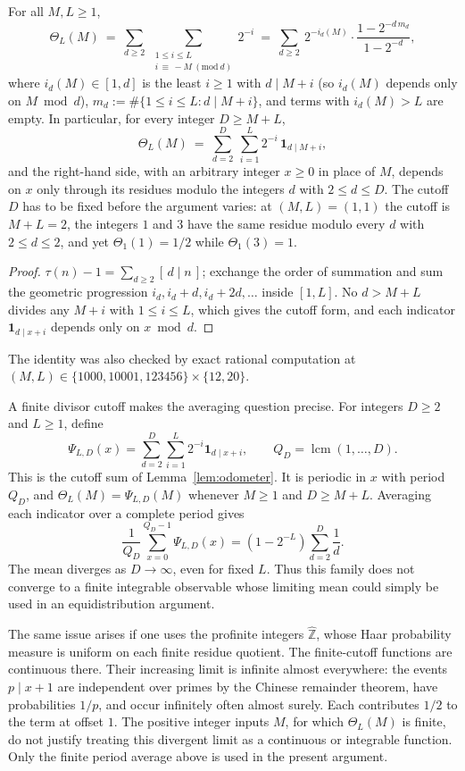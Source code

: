 \begin{lem}
\label{lem:odometer}
For all $M,L\ge 1$,
\[
\Theta_L(M)\ =\ \sum_{d\ge 2}\ \sum_{\substack{1\le i\le L\\ i\,\equiv\,-M\ (\mathrm{mod}\ d)}} 2^{-i}
\ =\ \sum_{d\ge 2}\ 2^{-i_d(M)}\cdot\frac{1-2^{-d\,m_d}}{1-2^{-d}},
\]
where $i_d(M)\in[1,d]$ is the least $i\ge1$ with $d\mid M+i$ (so $i_d(M)$ depends only on
$M \bmod d$), $m_d := \#\{1\le i\le L: d\mid M+i\}$, and terms with $i_d(M)>L$ are empty. In
particular, for every integer $D\ge M+L$,
\[
\Theta_L(M)\ =\ \sum_{d=2}^{D}\ \sum_{i=1}^{L} 2^{-i}\,\mathbf 1_{d\mid M+i},
\]
and the right-hand side, with an arbitrary integer $x\ge0$ in place of $M$, depends on $x$ only
through its residues modulo the integers $d$ with $2\le d\le D$. The cutoff $D$ has to be fixed
before the argument varies: at $(M,L)=(1,1)$ the cutoff is $M+L=2$, the integers $1$ and $3$ have
the same residue modulo every $d$ with $2\le d\le 2$, and yet $\Theta_1(1)=1/2$ while
$\Theta_1(3)=1$.
\end{lem}
\begin{proof}
$\tau(n)-1=\sum_{d\ge2}[\,d\mid n\,]$; exchange the order of summation and sum the geometric
progression $i_d, i_d+d, i_d+2d,\dots$ inside $[1,L]$. No $d>M+L$ divides any $M+i$ with
$1\le i\le L$, which gives the cutoff form, and each indicator $\mathbf 1_{d\mid x+i}$ depends
only on $x \bmod d$.
\end{proof}
The identity was also checked by exact rational computation at
$(M,L)\in\{1000,10001,123456\}\times\{12,20\}$.

A finite divisor cutoff makes the averaging question precise.  For
integers $D\ge2$ and $L\ge1$, define
\[
 \Psi_{L,D}(x)=\sum_{d=2}^{D}\sum_{i=1}^{L}2^{-i}
                  \mathbf1_{d\mid x+i},\qquad
 Q_D=\operatorname{lcm}(1,\ldots,D).
\]
This is the cutoff sum of Lemma~\ref{lem:odometer}.  It is periodic in $x$
with period $Q_D$, and
$\Theta_L(M)=\Psi_{L,D}(M)$ whenever $M\ge1$ and $D\ge M+L$.
Averaging each indicator over a complete period gives
\[
 \frac1{Q_D}\sum_{x=0}^{Q_D-1}\Psi_{L,D}(x)
   =(1-2^{-L})\sum_{d=2}^{D}\frac1d.
\]
The mean diverges as $D\to\infty$, even for fixed $L$.
Thus this family does not converge to a finite integrable observable
whose limiting mean could simply be used in an equidistribution
argument.

The same issue arises if one uses the profinite integers
$\widehat{\mathbb Z}$, whose Haar probability measure is uniform
on each finite residue quotient.  The finite-cutoff functions are
continuous there.  Their increasing limit is infinite almost
everywhere: the events $p\mid x+1$ are independent over primes by
the Chinese remainder theorem, have probabilities $1/p$, and occur
infinitely often almost surely.  Each contributes $1/2$ to the
term at offset $1$.  The positive integer inputs $M$, for which
$\Theta_L(M)$ is finite, do not justify treating this divergent
limit as a continuous or integrable function.  Only the finite
period average above is used in the present argument.

